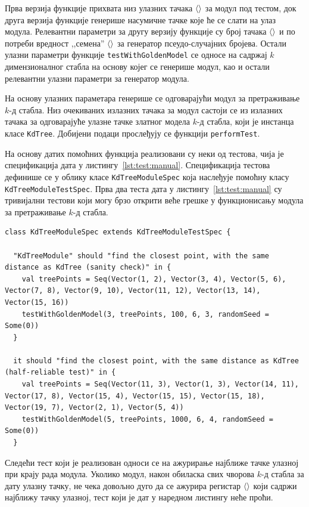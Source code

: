 \documentclass[master]{finthesis}
\newcommand*{\kdim}[1]{\texorpdfstring{$k$\Hyphdash}{k-}димензионал#1}
\newcommand*{\kd}{\texorpdfstring{$k$}{k}-д }
\newcommand*{\correctmath}[1]{%
    \ifcsname mathCorrectionFor#1\endcsname%
        \csname mathCorrectionFor#1\endcsname%
    \else%
        #1%
    \fi%
}
\newcommand*{\mfield}[1]{{\langle\correctmath{#1}\/\rangle}}
\newcommand*{\field}[1]{\texorpdfstring{$\mfield{#1}$}{⟨#1⟩}}
\newcommand*{\prog}[1]{\texttt{#1}}
\newcommand*{\func}[1]{\prog{#1}}
\begin{document}
Прва верзија функције прихвата низ улазних тачака \field{queryPoints} за модул под тестом, док друга верзија функције генерише насумичне тачке које ће се слати на улаз модула. Релевантни параметри за другу верзију функције су број тачака \field{numQueryPoints} и по потреби вредност ,,семена'' \field{randomSeed} за генератор псеудо-случајних бројева. Остали улазни параметри функције \func{testWithGoldenModel} се односе на садржај \kdim{ног} стабла на основу којег се генерише модул, као и остали релевантни улазни параметри за генератор модула.

На основу улазних параметара генерише се одговарајући модул за претраживање \kd стабла. Низ очекиваних излазних тачака за модул састоји се из излазних тачака за одговарајуће улазне тачке златног модела \kd стабла, који је инстанца класе \prog{KdTree}. Добијени подаци прослеђују се функцији \func{performTest}.

На основу датих помоћних функција реализовани су неки од тестова, чија је спецификација дата у листингу~\ref{lst:test:manual}. Спецификација тестова дефинише се у облику класе \prog{KdTreeModuleSpec} која наслеђује помоћну класу \prog{KdTreeModuleTestSpec}. Прва два теста дата у листингу~\ref{lst:test:manual} су тривијални тестови који могу брзо открити веће грешке у функционисању модула за претраживање \kd стабла.

\begin{lstlisting}[style=Chisel, caption={Реализација тривијалних тестова који користе помоћне функције класе \prog{KdTreeModuleTestSpec}.}, label={lst:test:manual}]
class KdTreeModuleSpec extends KdTreeModuleTestSpec {

  "KdTreeModule" should "find the closest point, with the same distance as KdTree (sanity check)" in {
    val treePoints = Seq(Vector(1, 2), Vector(3, 4), Vector(5, 6), Vector(7, 8), Vector(9, 10), Vector(11, 12), Vector(13, 14), Vector(15, 16))
    testWithGoldenModel(3, treePoints, 100, 6, 3, randomSeed = Some(0))
  }

  it should "find the closest point, with the same distance as KdTree (half-reliable test)" in {
    val treePoints = Seq(Vector(11, 3), Vector(1, 3), Vector(14, 11), Vector(17, 8), Vector(15, 4), Vector(15, 15), Vector(15, 18), Vector(19, 7), Vector(2, 1), Vector(5, 4))
    testWithGoldenModel(5, treePoints, 1000, 6, 4, randomSeed = Some(0))
  }
\end{lstlisting}

Следећи тест који је реализован односи се на ажурирање најближе тачке улазној при крају рада модула. Уколико модул, након обиласка свих чворова \kd стабла за дату улазну тачку, не чека довољно дуго да се ажурира регистар \field{closestPoint} који садржи најближу тачку улазној, тест који је дат у наредном листингу неће проћи.
\end{document}
